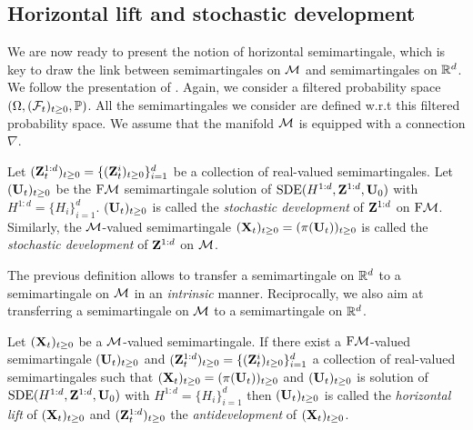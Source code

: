 \subsection{Horizontal lift and stochastic development}
\label{sec:horiz-lift-stoch}

We are now ready to present the notion of horizontal semimartingale, which is
key to draw the link between semimartingales on $\mathcal M$ and semimartingales on
$\mathbb{R}^d$. We follow the presentation of \citet[Section
2.3]{hsu2002stochastic}. Again, we consider a filtered probability space
$(\Omega, (\mathcal{F}_t)_{t \geq 0}, \mathbb{P})$. All the semimartingales we consider are
defined w.r.t this filtered probability space. We assume that the manifold $\mathcal M$
is equipped with a connection $\nabla$.

\begin{definition}
  Let $(\mathbf{Z}^{1:d}_t)_{t \geq 0} = \{(\mathbf{Z}_t^i)_{t \geq 0}\}_{i=1}^d$ be a
  collection of real-valued semimartingales.  Let $(\mathbf{U}_t)_{t \geq 0}$ be the
  $\mathrm{F}\mathcal{M}$ semimartingale solution of $\mathrm{SDE}(H^{1:d}, \mathbf{Z}^{1:d}, \mathbf{U}_0)$ with
  $H^{1:d} = \{H_i\}_{i=1}^d$. $(\mathbf{U}_t)_{t \geq 0}$ is called the \emph{stochastic
    development} of $\mathbf{Z}^{1:d}$ on $\mathrm{F}\mathcal{M}$. Similarly, the $\mathcal M$-valued
  semimartingale $(\mathbf{X}_t)_{t \geq 0} = (\pi(\mathbf{U}_t))_{t \geq 0}$ is called the
  \emph{stochastic development} of $\mathbf{Z}^{1:d}$ on $\mathcal M$.
\end{definition}

The previous definition allows to transfer a semimartingale on $\mathbb{R}^d$ to a
semimartingale on $\mathcal M$ in an \emph{intrinsic} manner. Reciprocally, we also aim
at transferring a semimartingale on $\mathcal M$ to a semimartingale on $\mathbb{R}^d$.

\begin{definition}
  Let $(\mathbf{X}_t)_{t \geq 0}$ be a $\mathcal M$-valued semimartingale. If there exist a
  $\mathrm{F}\mathcal{M}$-valued semimartingale $(\mathbf{U}_t)_{t \geq 0}$ and
  $(\mathbf{Z}^{1:d}_t)_{t \geq 0} = \{(\mathbf{Z}_t^i)_{t \geq 0}\}_{i=1}^d$ a collection
  of real-valued semimartingales such that
  $(\mathbf{X}_t)_{t \geq 0} = (\pi(\mathbf{U}_t))_{t \geq 0}$ and $(\mathbf{U}_t)_{t \geq 0}$ is
  solution of $\mathrm{SDE}(H^{1:d}, \mathbf{Z}^{1:d}, \mathbf{U}_0)$ with
  $H^{1:d} = \{H_i\}_{i=1}^d$ then $(\mathbf{U}_t)_{t \geq 0}$ is called the
  \emph{horizontal lift} of $(\mathbf{X}_t)_{t \geq 0}$ and
  $(\mathbf{Z}^{1:d}_t)_{t \geq 0}$ the \emph{antidevelopment} of
  $(\mathbf{X}_t)_{t \geq 0}$.
\end{definition}

